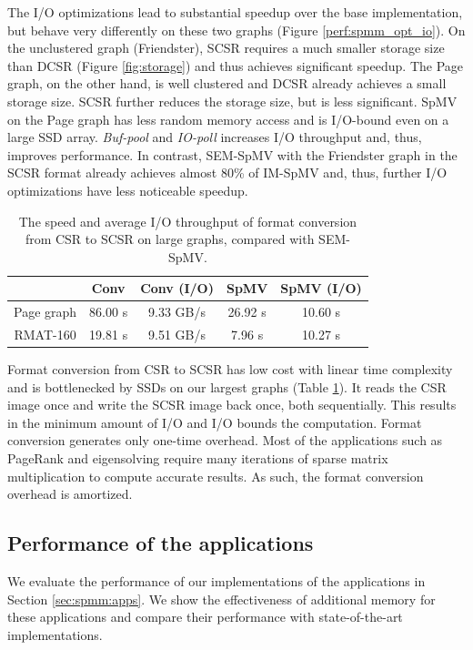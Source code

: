 The I/O optimizations lead to substantial speedup over the base implementation,
but behave very differently on these two graphs (Figure \ref{perf:spmm_opt_io}).
On the unclustered graph (Friendster), SCSR requires a much smaller storage size
than DCSR (Figure \ref{fig:storage}) and thus achieves significant
speedup. The Page graph, on the other hand, is well clustered and DCSR already
achieves a small storage size. SCSR further reduces the storage size, but is
less significant. SpMV on the Page graph has less random memory access and is
I/O-bound even on a large SSD array. \textit{Buf-pool} and \textit{IO-poll}
increases I/O throughput and, thus, improves performance. In contrast, SEM-SpMV
with the Friendster graph in the SCSR format already achieves almost 80\% of
IM-SpMV and, thus, further I/O optimizations have less noticeable speedup.

\begin{table}
\begin{center}
\footnotesize
\begin{tabular}{|c|c|c|c|c|}
\hline
	& Conv & Conv (I/O) & SpMV & SpMV (I/O) \\
\hline
Page graph & 86.00 s & 9.33 GB/s & 26.92 s & 10.60 s\\
\hline
RMAT-160 & 19.81 s & 9.51 GB/s & 7.96 s & 10.27 s\\
\hline
\end{tabular}
\normalsize
\end{center}
\caption{The speed and average I/O throughput of format conversion from CSR
	to SCSR on large graphs, compared with SEM-SpMV.}
\label{convert}
\end{table}

Format conversion from CSR to SCSR has low cost with linear time complexity and
is bottlenecked by SSDs on our largest graphs (Table \ref{convert}).
It reads the CSR image once and write the SCSR image back once, both sequentially.
This results in the minimum amount of I/O and I/O bounds the computation.
Format conversion generates only one-time overhead. Most of the applications
such as PageRank and eigensolving require many iterations of sparse matrix
multiplication to compute accurate results. As such, the format conversion
overhead is amortized.

\subsection{Performance of the applications}

We evaluate the performance of our implementations of the applications in
Section \ref{sec:spmm:apps}. We show the effectiveness of additional memory for
these applications and compare their performance with state-of-the-art
implementations.

